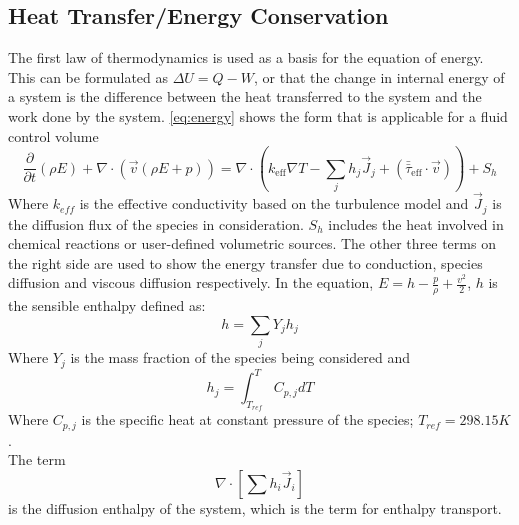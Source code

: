 \documentclass[11pt,a4paper,twoside,oneside]{article}
\begin{document}
\subsection{Heat Transfer/Energy Conservation} \label{sec:heattra}
\vspace{.3cm}
The first law of thermodynamics is used as a basis for the equation of energy. This can be formulated as $\Delta U=Q-W$, or that the change in internal energy of a system is the difference between the heat transferred to the system and the work done by the system.  \ref{eq:energy} shows the form that is applicable for a fluid control volume\cite{cfdintro}\cite{versteeg}
\begin{equation}
    \label{eq:energy}
    \frac{\partial}{\partial t}(\rho E)+\nabla \cdot(\vec{v}(\rho E+p))=\nabla \cdot\left(k_{\mathrm{eff}} \nabla T-\sum_{j} h_{j} \vec{J}_{j}+\left(\bar{\bar{\tau}}_{\mathrm{eff}} \cdot \vec{v}\right)\right)+S_{h}
\end{equation}
Where $k_{eff}$ is the effective conductivity based on the turbulence model and $\vec{J}_j$ is the diffusion flux of the species in consideration. $S_h$ includes the heat involved in chemical reactions or user-defined volumetric sources. The other three terms on the right side are used to show the energy transfer due to conduction, species diffusion and viscous diffusion respectively\cite{fluth}. In the equation, $E = h-\frac{p}{\rho}+\frac{v^2}{2}$, $h$ is the sensible enthalpy defined as: $$h=\sum_jY_jh_j$$ Where $Y_j$ is the mass fraction of the species being considered and $$h_j=\int_{T_{ref}}^TC_{p,j}dT$$ Where $C_{p,j}$ is the specific heat at constant pressure of the species; $T_{ref}=298.15K$.\\
The term $$\nabla\cdot\left[\sum h_i\vec{J}_i\right] $$ is the diffusion enthalpy of the system, which is the term for enthalpy transport.
\end{document}
